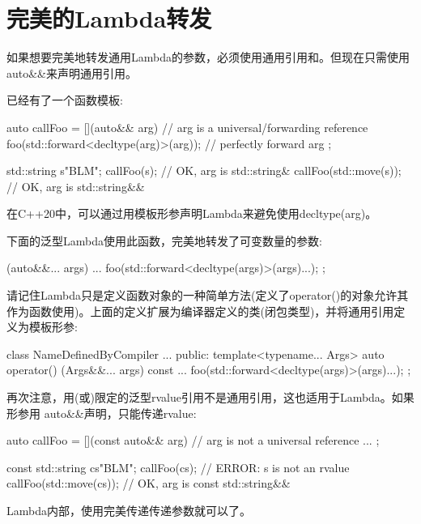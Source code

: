 \section{完美的Lambda转发}
如果想要完美地转发通用Lambda的参数，必须使用通用引用和。但现在只需使用auto\&\&来声明通用引用。

已经有了一个函数模板:

\begin{cppcode}
auto callFoo = [](auto&& arg) { // arg is a universal/forwarding reference
	foo(std::forward<decltype(arg)>(arg)); // perfectly forward arg
};

std::string s{"BLM"};
callFoo(s); // OK, arg is std::string&
callFoo(std::move(s)); // OK, arg is std::string&&
\end{cppcode}

在C++20中，可以通过用模板形参声明Lambda来避免使用decltype(arg)。

下面的泛型Lambda使用此函数，完美地转发了可变数量的参数:

\begin{cppcode}
[] (auto&&... args) {
	...
	foo(std::forward<decltype(args)>(args)...);
};
\end{cppcode}

请记住Lambda只是定义函数对象的一种简单方法(定义了operator()的对象允许其作为函数使用)。上面的定义扩展为编译器定义的类(闭包类型)，并将通用引用定义为模板形参:

\begin{cppcode}
class NameDefinedByCompiler {
	...
	public:
	template<typename... Args>
	auto operator() (Args&&... args) const {
		...
		foo(std::forward<decltype(args)>(args)...);
	}
};
\end{cppcode}

再次注意，用(或)限定的泛型rvalue引用不是通用引用，这也适用于Lambda。如果形参用 auto\&\&声明，只能传递rvalue:

\begin{cppcode}
auto callFoo = [](const auto&& arg) { // arg is not a universal reference
	...
};

const std::string cs{"BLM"};
callFoo(cs); // ERROR: s is not an rvalue
callFoo(std::move(cs)); // OK, arg is const std::string&&
\end{cppcode}

Lambda内部，使用完美传递传递参数就可以了。
















































